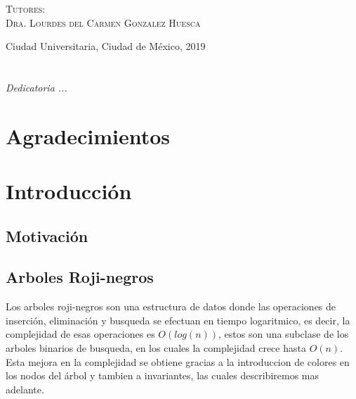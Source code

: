 \documentclass[letterpaper,12pt,oneside]{book}
\newcommand{\arns}{arboles roji-negros }
\theoremstyle{plain}
\theoremstyle{definition}
\theoremstyle{remark}
\begin{document}
\begin{titlepage}
\begin{minipage}[c][0.81\textheight][t]{0.75\textwidth}
\begin{center}
\vspace{0.5cm}

{\large\scshape Tutores:\\[0.3cm] {Dra. Lourdes del Carmen Gonzalez Huesca}}\\[.2in]

\vspace{0.5cm}

\large{Ciudad Universitaria, Ciudad de México,}{ }{2019}
\end{center}
\end{minipage}
\end{titlepage}



\frontmatter
\chapter*{}
\begin{flushright}%
\emph{Dedicatoria ...}
\thispagestyle{empty}
\end{flushright}

\chapter{Agradecimientos}

\tableofcontents
\listoffigures


\mainmatter

\chapter{Introducción} 
\section{Motivación}
\section{Arboles Roji-negros}
Los \arns son una estructura de datos donde las operaciones de inserci\'on, eliminaci\'on y busqueda se efectuan
en tiempo logaritmico, es decir, la complejidad de esas operaciones es $O(log(n))$, estos son una subclase de los
arboles binarios de busqueda, en los cuales la complejidad crece hasta $O(n)$. Esta mejora en la complejidad se obtiene 
gracias a la introduccion de colores en los nodos del \'arbol y tambien a invariantes, las cuales describiremos 
mas adelante.
\end{document}
